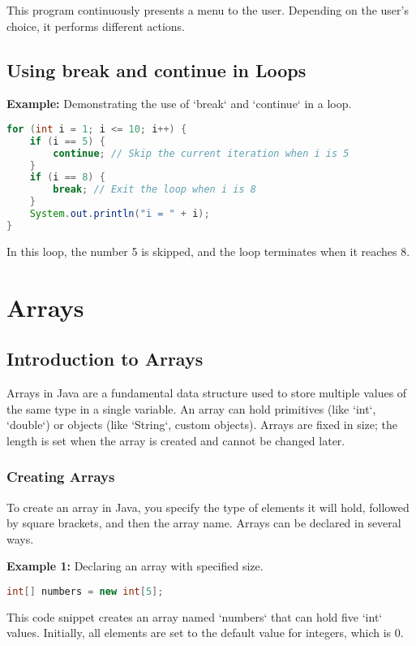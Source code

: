 \documentclass{article}
\begin{document}
This program continuously presents a menu to the user. Depending on the user's choice, it performs different actions.

\subsection{Using break and continue in Loops}
\textbf{Example:} Demonstrating the use of `break` and `continue` in a loop.

\begin{lstlisting}[language=Java]
for (int i = 1; i <= 10; i++) {
    if (i == 5) {
        continue; // Skip the current iteration when i is 5
    }
    if (i == 8) {
        break; // Exit the loop when i is 8
    }
    System.out.println("i = " + i);
}
\end{lstlisting}

In this loop, the number 5 is skipped, and the loop terminates when it reaches 8.


\newpage
\section{Arrays}
\subsection{Introduction to Arrays}
Arrays in Java are a fundamental data structure used to store multiple values of the same type in a single variable. An array can hold primitives (like `int`, `double`) or objects (like `String`, custom objects). Arrays are fixed in size; the length is set when the array is created and cannot be changed later.

\subsubsection{Creating Arrays}
To create an array in Java, you specify the type of elements it will hold, followed by square brackets, and then the array name. Arrays can be declared in several ways.

\textbf{Example 1:} Declaring an array with specified size.

\begin{lstlisting}[language=Java]
int[] numbers = new int[5];
\end{lstlisting}

This code snippet creates an array named `numbers` that can hold five `int` values. Initially, all elements are set to the default value for integers, which is 0.
\end{document}
